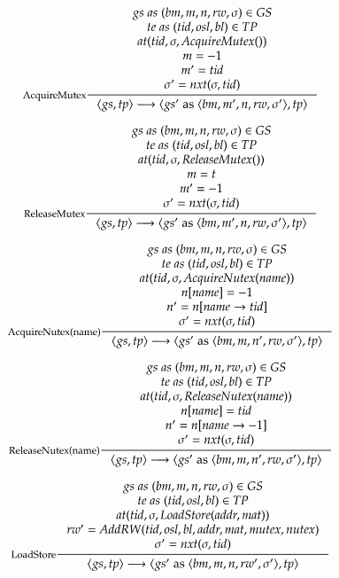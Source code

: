 \begin{framed}
  \[
  \inference[AcquireMutex]{
    gs\; as\; (bm, m, n, rw, \sigma) \in GS \\
    te\; as\; (tid, osl, bl) \in TP \\
    at(tid, \sigma, AcquireMutex()) \\
    m = -1 \\
    m' = tid \\
    \sigma' = nxt(\sigma, tid)}
  {\langle gs, tp \rangle \longrightarrow \langle gs'\; {\rm as}\; \langle bm,m',n,rw,\sigma' \rangle, tp \rangle}
  \]

  \[
  \inference[ReleaseMutex]{
    gs\; as\; (bm, m, n, rw, \sigma) \in GS \\
    te\; as\; (tid, osl, bl) \in TP \\
    at(tid, \sigma, ReleaseMutex()) \\
    m = t \\
    m' = -1 \\
    \sigma' = nxt(\sigma, tid)}
  {\langle gs, tp \rangle \longrightarrow \langle gs'\; {\rm as}\; \langle bm,m',n,rw,\sigma' \rangle, tp \rangle}
  \]

  \[
  \inference[AcquireNutex(name)]{
    gs\; as\; (bm, m, n, rw, \sigma) \in GS \\
    te\; as\; (tid, osl, bl) \in TP \\
    at(tid, \sigma, AcquireNutex(name)) \\
    n[name] = -1 \\
    n' = n[name \rightarrow tid] \\
    \sigma' = nxt(\sigma, tid)}
  {\langle gs, tp \rangle \longrightarrow \langle gs'\; {\rm as}\; \langle bm,m,n',rw,\sigma' \rangle, tp \rangle}
  \]

  \[
  \inference[ReleaseNutex(name)]{
    gs\; as\; (bm, m, n, rw, \sigma) \in GS \\
    te\; as\; (tid, osl, bl) \in TP \\
    at(tid, \sigma, ReleaseNutex(name)) \\
    n[name] = tid \\
    n' = n[name \rightarrow -1] \\
    \sigma' = nxt(\sigma, tid)}
  {\langle gs, tp \rangle \longrightarrow \langle gs'\; {\rm as}\; \langle bm,m,n',rw,\sigma' \rangle, tp \rangle}
  \]

  \[
  \inference[LoadStore]{
    gs\; as\; (bm, m, n, rw, \sigma) \in GS \\
    te\; as\; (tid, osl, bl) \in TP \\
    at(tid, \sigma, LoadStore(addr, mat)) \\
    rw' = AddRW(tid, osl, bl, addr, mat, mutex, nutex) \\
    \sigma' = nxt(\sigma, tid)}
  {\langle gs, tp \rangle \longrightarrow \langle gs'\; {\rm as}\; \langle bm,m,n,rw',\sigma' \rangle, tp \rangle}
  \]


\end{framed}
